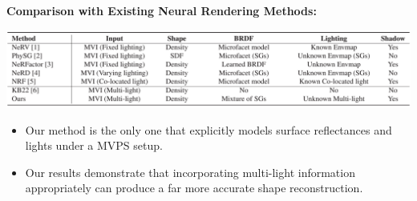 \documentclass[landscape,a0paper,fontscale=0.292]{baposter}
\begin{document}
\begin{poster}
{\begin{minipage}[c]{0.2\textwidth}
\begin{itemize}
        \end{itemize}  
        \vspace{0.5em}
    \end{minipage}\hfill
    \begin{minipage}[c]{0.45\textwidth}
        \textbf{\color{ctitle}Comparison with Existing Neural Rendering Methods:} 
        \vspace{-0.5em}
        \begin{center}
            \includegraphics[width=\textwidth]{images/table_relatedwork.pdf}
        \end{center}
        \vspace{-1em}
        \begin{itemize}
            \item Our method is the only one that explicitly models surface reflectances and lights under a MVPS setup.
            \item Our results demonstrate that incorporating multi-light information appropriately can produce a far more accurate shape reconstruction.
        \end{itemize}
         
    \end{minipage}
}


\end{poster}
\end{document}
